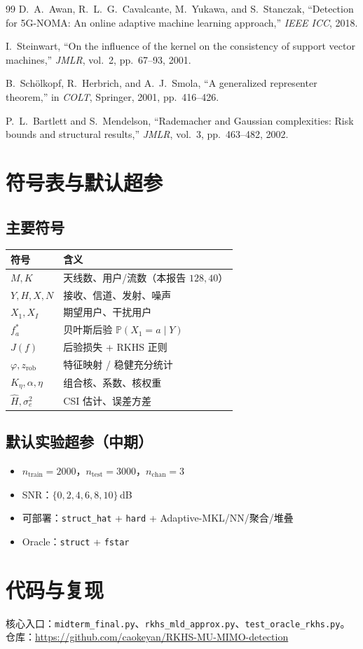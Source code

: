 \documentclass[12pt,a4paper,openany]{ctexrep}
\begin{document}
\begin{thebibliography}{99}
D.~A.~Awan, R.~L.~G.~Cavalcante, M.~Yukawa, and S.~Stanczak,
``Detection for 5G-NOMA: An online adaptive machine learning approach,''
\textit{IEEE ICC}, 2018.

I.~Steinwart,
``On the influence of the kernel on the consistency of support vector machines,''
\textit{JMLR}, vol.~2, pp.~67--93, 2001.

B.~Sch{\"o}lkopf, R.~Herbrich, and A.~J.~Smola,
``A generalized representer theorem,''
in \textit{COLT}, Springer, 2001, pp.~416--426.

P.~L.~Bartlett and S.~Mendelson,
``Rademacher and Gaussian complexities: Risk bounds and structural results,''
\textit{JMLR}, vol.~3, pp.~463--482, 2002.

\end{thebibliography}

\appendix
\chapter{符号表与默认超参}
\section{主要符号}
\begin{tabular}{ll}
\hline
符号 & 含义 \\
\hline
$M,K$ & 天线数、用户/流数（本报告 $128,40$） \\
$Y,H,X,N$ & 接收、信道、发射、噪声 \\
$X_1,X_I$ & 期望用户、干扰用户 \\
$f_a^*$ & 贝叶斯后验 $\mathbb{P}(X_1=a\mid Y)$ \\
$J(f)$ & 后验损失 + RKHS 正则 \\
$\varphi,z_{\mathrm{rob}}$ & 特征映射 / 稳健充分统计 \\
$K_\eta,\alpha,\eta$ & 组合核、系数、核权重 \\
$\hat H,\sigma_e^2$ & CSI 估计、误差方差 \\
\hline
\end{tabular}

\section{默认实验超参（中期）}
\begin{itemize}
  \item $n_{\mathrm{train}}=2000$，$n_{\mathrm{test}}=3000$，$n_{\mathrm{chan}}=3$
  \item SNR：$\{0,2,4,6,8,10\}$\,dB
  \item 可部署：\texttt{struct\_hat} + \texttt{hard} + Adaptive-MKL/NN/聚合/堆叠
  \item Oracle：\texttt{struct} + \texttt{fstar}
\end{itemize}

\chapter{代码与复现}
核心入口：\texttt{midterm\_final.py}、\texttt{rkhs\_mld\_approx.py}、\texttt{test\_oracle\_rkhs.py}。\\
仓库：\url{https://github.com/caokeyan/RKHS-MU-MIMO-detection}
\end{document}

